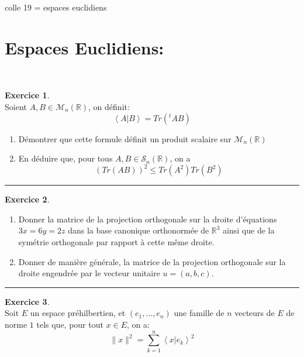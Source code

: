 \documentclass[a4paper,10pt]{article}
\theoremstyle{definition}
\theoremstyle{definition}
\newtheorem{exo}{Exercice}
\newcommand{\R}{\mathbb{R}}
\begin{document}
	
	
	\begin{center}
		\Large \sc colle 19 = espaces euclidiens 
	\end{center}

\section*{Espaces Euclidiens:}\hfill\\%
\begin{minipage}{1\linewidth}
	\begin{minipage}[t]{0.48\linewidth}
		\raggedright
		
		
		
		\begin{exo}\quad\\[0.25cm]
			Soient $A,B \in \mathcal{M}_n(\R)$, on définit:
			$$\left\langle A|B\right\rangle = Tr(^tAB) $$
			\begin{enumerate}
				\item Démontrer que cette formule définit un produit scalaire sur $\mathcal{M}_n(\R)$
				\item En déduire que, pour tous $A,B\in\mathcal{S}_n(\R)$, on a 
				$$(Tr(AB))^2 \leq Tr(A^2)Tr(B^2) $$
			\end{enumerate}
			
			\centering
			\rule{1\linewidth}{0.6pt}
		\end{exo}
	
			\begin{exo}\quad\\[0.25cm]
				\begin{enumerate}
					\item  Donner la matrice de la projection orthogonale sur la droite d'équations $3x=6y=2z$ dans la base canonique orthonormée de $\R^3$ ainsi que de la symétrie orthogonale par rapport à cette même droite.
					\item Donner de manière générale, la matrice de la projection orthogonale sur la droite engendrée par le vecteur unitaire $u=(a,b,c)$.
				\end{enumerate}

		
		
		
		\centering
		\rule{1\linewidth}{0.6pt}
	\end{exo}	
	
	\begin{exo}\quad\\[0.25cm]
		Soit $E$ un espace préhilbertien, et $(e_1,...,e_n)$ une famille de $n$ vecteurs de $E$ de norme $1$ tels que, pour tout $x\in E $, on a: 
		$$\|x\|^2 = \sum_{k=1}^{n} \left\langle x|e_k\right\rangle^2 $$
		

\end{exo}
\end{minipage}
\end{minipage}
\end{document}
